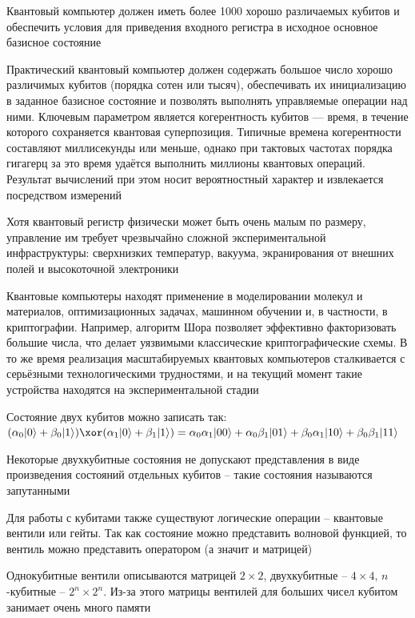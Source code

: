 \documentclass[12pt]{article}
\begin{document}
\meduimvspace

Квантовый компьютер должен иметь более 1000 хорошо различаемых кубитов и обеспечить условия для приведения входного регистра в исходное основное базисное состояние 

Практический квантовый компьютер должен содержать большое число хорошо различимых кубитов (порядка сотен или тысяч), обеспечивать их инициализацию в заданное базисное состояние и позволять выполнять управляемые операции над ними. Ключевым параметром является когерентность кубитов — время, в течение которого сохраняется квантовая суперпозиция. Типичные времена когерентности составляют миллисекунды или меньше, однако при тактовых частотах порядка гигагерц за это время удаётся выполнить миллионы квантовых операций. Результат вычислений при этом носит вероятностный характер и извлекается посредством измерений

Хотя квантовый регистр физически может быть очень малым по размеру, управление им требует чрезвычайно сложной экспериментальной инфраструктуры: сверхнизких температур, вакуума, экранирования от внешних полей и высокоточной электроники

Квантовые компьютеры находят применение в моделировании молекул и материалов, оптимизационных задачах, машинном обучении и, в частности, в криптографии. Например, алгоритм Шора позволяет эффективно факторизовать большие числа, что делает уязвимыми классические криптографические схемы. В то же время реализация масштабируемых квантовых компьютеров сталкивается с серьёзными технологическими трудностями, и на текущий момент такие устройства находятся на экспериментальной стадии

\meduimvspace

Состояние двух кубитов можно записать так: $(\alpha_0 |0\rangle + \beta_0 |1\rangle) \xor (\alpha_1 |0\rangle + \beta_1 |1\rangle) = \alpha_0 \alpha_1 |00\rangle + \alpha_0 \beta_1 |01\rangle + \beta_0 \alpha_1 |10\rangle + \beta_0 \beta_1 |11\rangle$

Некоторые двухкубитные состояния не допускают представления в виде произведения состояний отдельных кубитов -- такие состояния называются запутанными


Для работы с кубитами также существуют логические операции -- квантовые вентили или гейты. Так как состояние можно представить волновой функцией, то вентиль можно представить оператором (а значит и матрицей)

Однокубитные вентили описываются матрицей $2 \times 2$, двухкубитные -- $4 \times 4$, $n$-кубитные -- $2^n \times 2^n$. Из-за этого матрицы вентилей для больших чисел кубитом занимает очень много памяти
\end{document}
